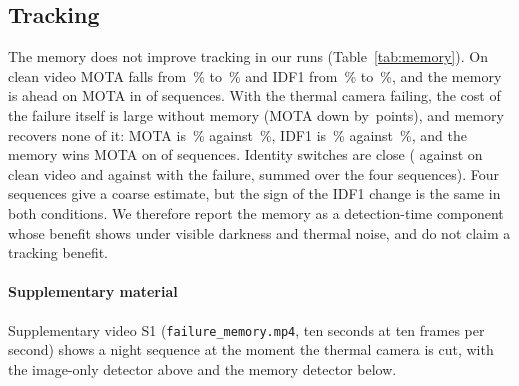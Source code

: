 \subsection{Tracking}
\label{sec:kaisttracking}
The memory does not improve tracking in our runs (Table~\ref{tab:memory}). On clean video MOTA falls from \trkCleanImageMota{}\,\% to \trkCleanMemoryMota{}\,\% and IDF1 from \trkCleanImageIdfOne{}\,\% to \trkCleanMemoryIdfOne{}\,\%, and the memory is ahead on MOTA in \trkCleanMemoryWinsMota{} of \trkSeqCount{} sequences. With the thermal camera failing, the cost of the failure itself is large without memory (MOTA down by \trkFaultCostImageMota{}\,points), and memory recovers none of it: MOTA is \trkThermalLostMemoryMota{}\,\% against \trkThermalLostImageMota{}\,\%, IDF1 is \trkThermalLostMemoryIdfOne{}\,\% against \trkThermalLostImageIdfOne{}\,\%, and the memory wins MOTA on \trkThermalLostMemoryWinsMota{} of \trkSeqCount{} sequences. Identity switches are close (\trkCleanMemorySwitches{} against \trkCleanImageSwitches{} on clean video and \trkThermalLostMemorySwitches{} against \trkThermalLostImageSwitches{} with the failure, summed over the four sequences). Four sequences give a coarse estimate, but the sign of the IDF1 change is the same in both conditions. We therefore report the memory as a detection-time component whose benefit shows under visible darkness and thermal noise, and do not claim a tracking benefit.

\paragraph{Supplementary material}
Supplementary video S1 (\texttt{failure\_memory.mp4}, ten seconds at ten frames per second) shows a night sequence at the moment the thermal camera is cut, with the image-only detector above and the memory detector below.
